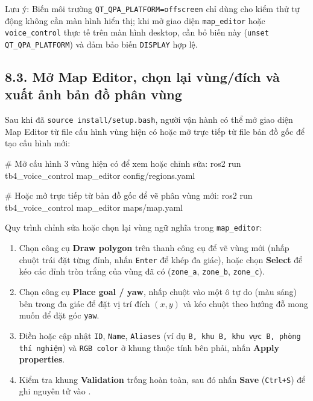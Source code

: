 Lưu ý: Biến môi trường \texttt{QT\_QPA\_PLATFORM=offscreen} chỉ dùng cho kiểm thử tự động không cần màn hình hiển thị; khi mở giao diện \texttt{map\_editor} hoặc \texttt{voice\_control} thực tế trên màn hình desktop, cần bỏ biến này (\texttt{unset QT\_QPA\_PLATFORM}) và đảm bảo biến \texttt{DISPLAY} hợp lệ.

\subsection*{8.3. Mở Map Editor, chọn lại vùng/đích và xuất ảnh bản đồ phân vùng}

Sau khi đã \texttt{source install/setup.bash}, người vận hành có thể mở giao diện Map Editor từ file cấu hình vùng hiện có hoặc mở trực tiếp từ file bản đồ gốc để tạo cấu hình mới:

\begin{svcode}
# Mở cấu hình 3 vùng hiện có để xem hoặc chỉnh sửa:
ros2 run tb4_voice_control map_editor config/regions.yaml

# Hoặc mở trực tiếp từ bản đồ gốc để vẽ phân vùng mới:
ros2 run tb4_voice_control map_editor maps/map.yaml
\end{svcode}

Quy trình chỉnh sửa hoặc chọn lại vùng ngữ nghĩa trong \texttt{map\_editor}:
\begin{enumerate}[leftmargin=1.2cm]
  \item Chọn công cụ \textbf{Draw polygon} trên thanh công cụ để vẽ vùng mới (nhấp chuột trái đặt từng đỉnh, nhấn \texttt{Enter} để khép đa giác), hoặc chọn \textbf{Select} để kéo các đỉnh tròn trắng của vùng đã có (\texttt{zone\_a}, \texttt{zone\_b}, \texttt{zone\_c}).
  \item Chọn công cụ \textbf{Place goal / yaw}, nhấp chuột vào một ô tự do (màu sáng) bên trong đa giác để đặt vị trí đích $(x, y)$ và kéo chuột theo hướng đỗ mong muốn để đặt góc \texttt{yaw}.
  \item Điền hoặc cập nhật \texttt{ID}, \texttt{Name}, \texttt{Aliases} (ví dụ \texttt{B, khu B, khu vực B, phòng thí nghiệm}) và \texttt{RGB color} ở khung thuộc tính bên phải, nhấn \textbf{Apply properties}.
  \item Kiểm tra khung \textbf{Validation} trống hoàn toàn, sau đó nhấn \textbf{Save} (\texttt{Ctrl+S}) để ghi nguyên tử vào .
\end{enumerate}

